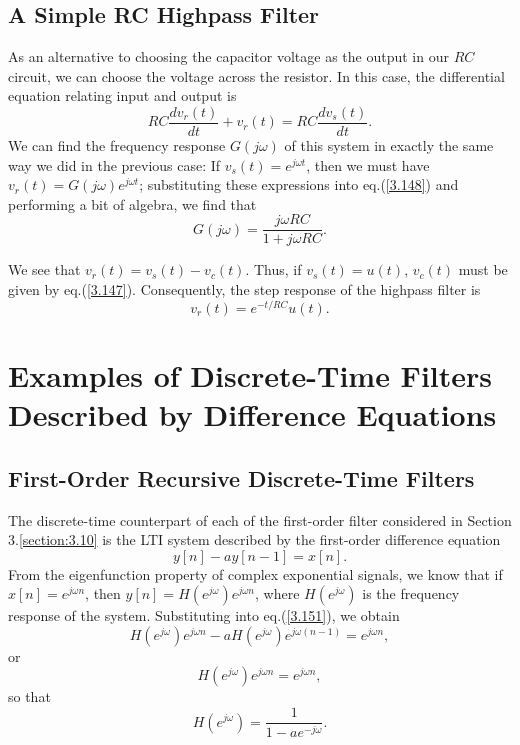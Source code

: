 \documentclass[a4paper,twoside]{book}
\begin{document}
\subsection{A Simple RC Highpass Filter}

As an alternative to choosing the capacitor voltage as the output in our $RC$ circuit, we can choose the voltage across the resistor. In this case, the differential equation relating input and output is
\begin{equation}
    RC\frac{dv_r(t)}{dt}+v_r(t)=RC\frac{dv_s(t)}{dt}.
    \label{3.148}
\end{equation}
We can find the frequency response $G(j\omega)$ of this system in exactly the same way we did in the previous case: If $v_s(t)=e^{j\omega t}$, then we must have $v_r(t)=G(j\omega)e^{j\omega t}$; substituting these expressions into eq.\;(\ref{3.148}) and performing a bit of algebra, we find that
\begin{equation}
    G(j\omega)=\frac{j\omega RC}{1+j\omega RC}.
    \label{3.149}
\end{equation}

We see that $v_r(t)=v_s(t)-v_c(t)$. Thus, if $v_s(t)=u(t)$, $v_c(t)$ must be given by eq.\;(\ref{3.147}). Consequently, the step response of the highpass filter is
\begin{equation}
    v_r(t)=e^{-t/RC}u(t).
    \label{3.150}
\end{equation}

\section{Examples of Discrete-Time Filters Described by Difference Equations}
\subsection{First-Order Recursive Discrete-Time Filters}

The discrete-time counterpart of each of the first-order filter considered in Section 3.\ref{section:3.10} is the LTI system described by the first-order difference equation
\begin{equation}
    y[n]-ay[n-1]=x[n].
    \label{3.151}
\end{equation}
From the eigenfunction property of complex exponential signals, we know that if $x[n]=e^{j\omega n}$, then $y[n]=H(e^{j\omega})e^{j\omega n}$, where $H(e^{j\omega})$ is the frequency response of the system. Substituting into eq.\;(\ref{3.151}), we obtain
\begin{equation}
    H(e^{j\omega})e^{j\omega n}-aH(e^{j\omega})e^{j\omega(n-1)}=e^{j\omega n},
    \label{3.152}
\end{equation}
or
\begin{equation}
    [1-ae^{-j\omega}]H(e^{j\omega})e^{j\omega n}=e^{j\omega n},
    \label{3.153}
\end{equation}
so that
\begin{equation}
    H(e^{j\omega})=\frac1{1-ae^{-j\omega}}.
    \label{3.154}
\end{equation}
\end{document}
